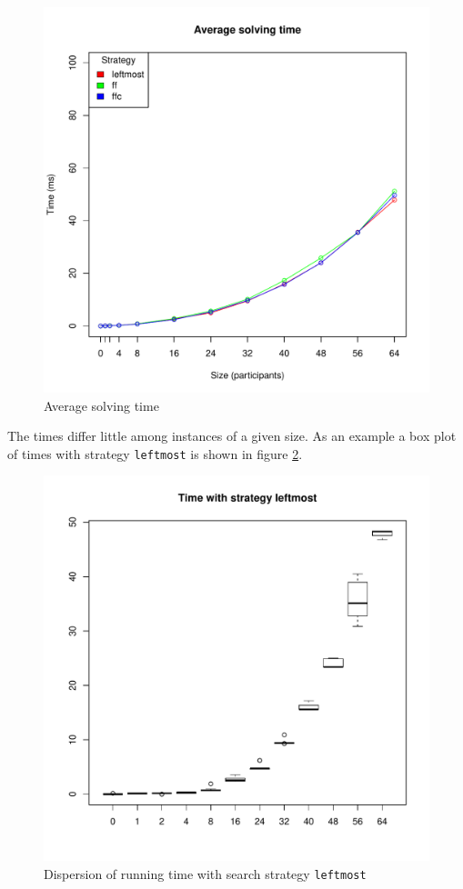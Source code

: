 \documentclass{article}
\newcommand{\code}[1]{\texttt{#1}}
\begin{document}
\begin{figure}
\centering
\includegraphics[width=\linewidth]{time}
\caption{Average solving time}
\label{fig:time}
\end{figure}

The times differ little among instances of a given size.
As an example a box plot of times with strategy \code{leftmost} is shown
in figure \ref{fig:leftmost-time}.

\begin{figure}
\centering
\includegraphics[width=\linewidth]{leftmost_time}
\caption{Dispersion of running time with search strategy \code{leftmost}}
\label{fig:leftmost-time}
\end{figure}
\end{document}
